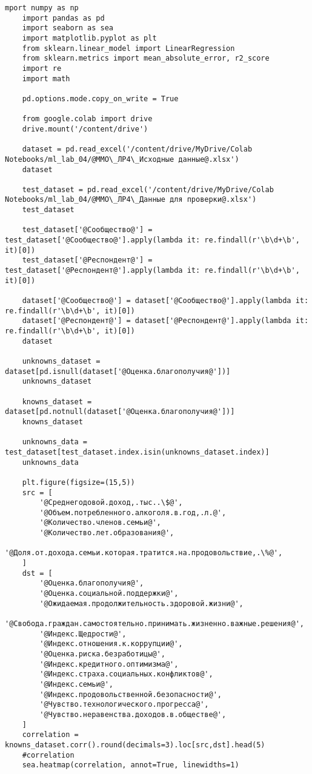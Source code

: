 \begin{lstlisting}[label=lst:1,caption=Анализ результатов социологического исследования]
	mport numpy as np
	import pandas as pd
	import seaborn as sea
	import matplotlib.pyplot as plt
	from sklearn.linear_model import LinearRegression
	from sklearn.metrics import mean_absolute_error, r2_score
	import re
	import math
	
	pd.options.mode.copy_on_write = True
	
	from google.colab import drive
	drive.mount('/content/drive')
	
	dataset = pd.read_excel('/content/drive/MyDrive/Colab Notebooks/ml_lab_04/@ММО\_ЛР4\_Исходные данные@.xlsx')
	dataset
	
	test_dataset = pd.read_excel('/content/drive/MyDrive/Colab Notebooks/ml_lab_04/@ММО\_ЛР4\_Данные для проверки@.xlsx')
	test_dataset
	
	test_dataset['@Сообщество@'] = test_dataset['@Сообщество@'].apply(lambda it: re.findall(r'\b\d+\b', it)[0])
	test_dataset['@Респондент@'] = test_dataset['@Респондент@'].apply(lambda it: re.findall(r'\b\d+\b', it)[0])
	
	dataset['@Сообщество@'] = dataset['@Сообщество@'].apply(lambda it: re.findall(r'\b\d+\b', it)[0])
	dataset['@Респондент@'] = dataset['@Респондент@'].apply(lambda it: re.findall(r'\b\d+\b', it)[0])
	dataset
	
	unknowns_dataset = dataset[pd.isnull(dataset['@Оценка.благополучия@'])]
	unknowns_dataset
	
	knowns_dataset = dataset[pd.notnull(dataset['@Оценка.благополучия@'])]
	knowns_dataset
	
	unknowns_data = test_dataset[test_dataset.index.isin(unknowns_dataset.index)]
	unknowns_data
	
	plt.figure(figsize=(15,5))
	src = [
		'@Среднегодовой.доход,.тыс..\$@',
		'@Объем.потребленного.алкоголя.в.год,.л.@',
		'@Количество.членов.семьи@',
		'@Количество.лет.образования@',
		'@Доля.от.дохода.семьи.которая.тратится.на.продовольствие,.\%@',
	]
	dst = [
		'@Оценка.благополучия@',
		'@Оценка.социальной.поддержки@',
		'@Ожидаемая.продолжительность.здоровой.жизни@',
		'@Свобода.граждан.самостоятельно.принимать.жизненно.важные.решения@',
		'@Индекс.Щедрости@',
		'@Индекс.отношения.к.коррупции@',
		'@Оценка.риска.безработицы@',
		'@Индекс.кредитного.оптимизма@',
		'@Индекс.страха.социальных.конфликтов@',
		'@Индекс.семьи@',
		'@Индекс.продовольственной.безопасности@',
		'@Чувство.технологического.прогресса@',
		'@Чувство.неравенства.доходов.в.обществе@',
	]
	correlation = knowns_dataset.corr().round(decimals=3).loc[src,dst].head(5)
	#correlation
	sea.heatmap(correlation, annot=True, linewidths=1)
	

\end{lstlisting}
